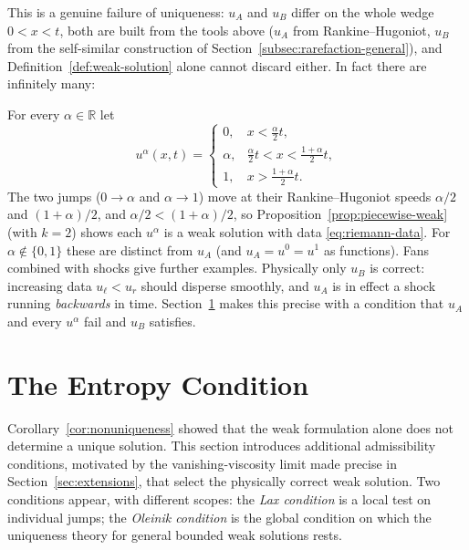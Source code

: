This is a genuine failure of uniqueness: $u_A$ and $u_B$ differ on the whole
wedge $0<x<t$, both are built from the tools above ($u_A$ from
Rankine--Hugoniot, $u_B$ from the self-similar construction of
Section~\ref{subsec:rarefaction-general}), and
Definition~\ref{def:weak-solution} alone cannot discard either. In fact there
are infinitely many:

\begin{remark}
\label{rem:infinite-family}
For every $\alpha\in\mathbb{R}$ let
\begin{equation*}
  u^\alpha(x,t)=\begin{cases}
    0, & x<\tfrac{\alpha}{2}t,\\
    \alpha, & \tfrac{\alpha}{2}t<x<\tfrac{1+\alpha}{2}t,\\
    1, & x>\tfrac{1+\alpha}{2}t .
  \end{cases}
\end{equation*}
The two jumps ($0\to\alpha$ and $\alpha\to1$) move at their
Rankine--Hugoniot speeds $\alpha/2$ and $(1+\alpha)/2$, and
$\alpha/2<(1+\alpha)/2$, so Proposition~\ref{prop:piecewise-weak}
(with $k=2$) shows each $u^\alpha$ is a weak solution with data
\eqref{eq:riemann-data}. For $\alpha\notin\{0,1\}$ these are distinct
from $u_A$ (and $u_A=u^0=u^1$ as functions). Fans combined with shocks
give further examples. Physically only $u_B$ is correct: increasing data
$u_\ell<u_r$ should disperse smoothly, and $u_A$ is in effect a shock running
\emph{backwards} in time. Section~\ref{sec:entropy-condition} makes this
precise with a condition that $u_A$ and every $u^\alpha$ fail and $u_B$
satisfies.
\end{remark}


\section{The Entropy Condition}
\label{sec:entropy-condition}

Corollary~\ref{cor:nonuniqueness} showed that the weak formulation alone
does not determine a unique solution. This section introduces additional
admissibility conditions, motivated by the vanishing-viscosity limit made
precise in Section~\ref{sec:extensions}, that select the physically
correct weak solution. Two conditions appear, with different scopes: the
\emph{Lax condition} is a local test on individual jumps; the
\emph{Oleinik condition} is the global condition on which the uniqueness
theory for general bounded weak solutions rests.

